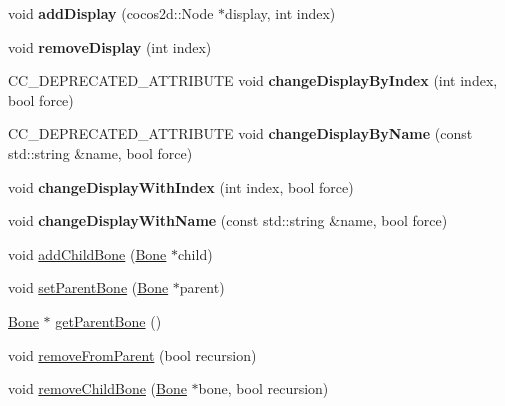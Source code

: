 \begin{DoxyCompactItemize}
\item 
\mbox{\label{classcocostudio_1_1Bone_aaf7dcb2b91ea05721bc54574dee64ccc}} 
void {\bfseries add\+Display} (cocos2d\+::\+Node $\ast$display, int index)
\item 
\mbox{\label{classcocostudio_1_1Bone_ac372d5f1d2f8d23ecc3d6567ace6653a}} 
void {\bfseries remove\+Display} (int index)
\item 
\mbox{\label{classcocostudio_1_1Bone_ac37e2af6d7328108e6a4c73bb8f89aaf}} 
C\+C\+\_\+\+D\+E\+P\+R\+E\+C\+A\+T\+E\+D\+\_\+\+A\+T\+T\+R\+I\+B\+U\+TE void {\bfseries change\+Display\+By\+Index} (int index, bool force)
\item 
\mbox{\label{classcocostudio_1_1Bone_aefc8dfdc552daa73b00e9271baab73b6}} 
C\+C\+\_\+\+D\+E\+P\+R\+E\+C\+A\+T\+E\+D\+\_\+\+A\+T\+T\+R\+I\+B\+U\+TE void {\bfseries change\+Display\+By\+Name} (const std\+::string \&name, bool force)
\item 
\mbox{\label{classcocostudio_1_1Bone_ad7715a8d6ee0d175d8755604961b9c27}} 
void {\bfseries change\+Display\+With\+Index} (int index, bool force)
\item 
\mbox{\label{classcocostudio_1_1Bone_ae2dc861a47c6354e80256803e738dfa5}} 
void {\bfseries change\+Display\+With\+Name} (const std\+::string \&name, bool force)
\item 
void \hyperlink{classcocostudio_1_1Bone_a0e2a59584601241d1f0cfbe5c3e240ca}{add\+Child\+Bone} (\hyperlink{classcocostudio_1_1Bone}{Bone} $\ast$child)
\item 
void \hyperlink{classcocostudio_1_1Bone_ac68dd00133f611910e2ceb5bc19a1618}{set\+Parent\+Bone} (\hyperlink{classcocostudio_1_1Bone}{Bone} $\ast$parent)
\item 
\hyperlink{classcocostudio_1_1Bone}{Bone} $\ast$ \hyperlink{classcocostudio_1_1Bone_a8ba5d1a05a287b334b6fbc03e3b82588}{get\+Parent\+Bone} ()
\item 
void \hyperlink{classcocostudio_1_1Bone_a2421050fc95af899b04e69ef7d276404}{remove\+From\+Parent} (bool recursion)
\item 
void \hyperlink{classcocostudio_1_1Bone_a59fa87941ea1aedd616e6b36ca7a5a25}{remove\+Child\+Bone} (\hyperlink{classcocostudio_1_1Bone}{Bone} $\ast$bone, bool recursion)

\end{DoxyCompactItemize}
